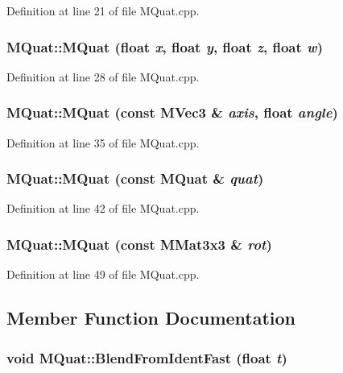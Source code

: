 Definition at line 21 of file MQuat.cpp.\hypertarget{class_m_quat_d5119507f40c8e5891690120e1f29c81}{
\subsubsection[{MQuat}]{\setlength{\rightskip}{0pt plus 5cm}MQuat::MQuat (float {\em x}, \/  float {\em y}, \/  float {\em z}, \/  float {\em w})}}
\label{class_m_quat_d5119507f40c8e5891690120e1f29c81}




Definition at line 28 of file MQuat.cpp.\hypertarget{class_m_quat_4072fed107ac31bde4da73c7a15f5e2b}{
\subsubsection[{MQuat}]{\setlength{\rightskip}{0pt plus 5cm}MQuat::MQuat (const {\bf MVec3} \& {\em axis}, \/  float {\em angle})}}
\label{class_m_quat_4072fed107ac31bde4da73c7a15f5e2b}




Definition at line 35 of file MQuat.cpp.\hypertarget{class_m_quat_b6c59f60d6af948d46f8792105cff2f2}{
\subsubsection[{MQuat}]{\setlength{\rightskip}{0pt plus 5cm}MQuat::MQuat (const {\bf MQuat} \& {\em quat})}}
\label{class_m_quat_b6c59f60d6af948d46f8792105cff2f2}




Definition at line 42 of file MQuat.cpp.\hypertarget{class_m_quat_5165e0d3a6ac93bc29862d30131212ad}{
\subsubsection[{MQuat}]{\setlength{\rightskip}{0pt plus 5cm}MQuat::MQuat (const {\bf MMat3x3} \& {\em rot})}}
\label{class_m_quat_5165e0d3a6ac93bc29862d30131212ad}




Definition at line 49 of file MQuat.cpp.

\subsection{Member Function Documentation}
\hypertarget{class_m_quat_8fda2e1badcf8a38c475b14c7c3cf87b}{
\subsubsection[{BlendFromIdentFast}]{\setlength{\rightskip}{0pt plus 5cm}void MQuat::BlendFromIdentFast (float {\em t})}}
\label{class_m_quat_8fda2e1badcf8a38c475b14c7c3cf87b}




